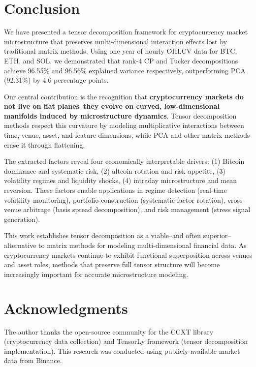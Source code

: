 \documentclass{article}
\begin{document}
\section{Conclusion}
\label{sec:conclusion}

We have presented a tensor decomposition framework for cryptocurrency market microstructure that preserves multi-dimensional interaction effects lost by traditional matrix methods. Using one year of hourly OHLCV data for BTC, ETH, and SOL, we demonstrated that rank-4 CP and Tucker decompositions achieve 96.55\% and 96.56\% explained variance respectively, outperforming PCA (92.31\%) by 4.6 percentage points.

Our central contribution is the recognition that \textbf{cryptocurrency markets do not live on flat planes--they evolve on curved, low-dimensional manifolds induced by microstructure dynamics}. Tensor decomposition methods respect this curvature by modeling multiplicative interactions between time, venue, asset, and feature dimensions, while PCA and other matrix methods erase it through flattening.

The extracted factors reveal four economically interpretable drivers: (1) Bitcoin dominance and systematic risk, (2) altcoin rotation and risk appetite, (3) volatility regimes and liquidity shocks, (4) intraday microstructure and mean reversion. These factors enable applications in regime detection (real-time volatility monitoring), portfolio construction (systematic factor rotation), cross-venue arbitrage (basis spread decomposition), and risk management (stress signal generation).

This work establishes tensor decomposition as a viable--and often superior--alternative to matrix methods for modeling multi-dimensional financial data. As cryptocurrency markets continue to exhibit functional superposition across venues and asset roles, methods that preserve full tensor structure will become increasingly important for accurate microstructure modeling.

\section*{Acknowledgments}

The author thanks the open-source community for the CCXT library (cryptocurrency data collection) and TensorLy framework (tensor decomposition implementation). This research was conducted using publicly available market data from Binance.
\end{document}
